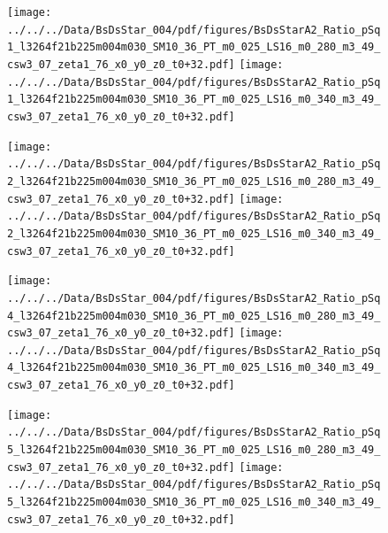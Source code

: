 \documentclass[a4paper,10pt]{article}
\begin{document}
\begin{figure}[p]
 \texttt{[image: ../../../Data/BsDsStar\_004/pdf/figures/BsDsStarA2\_Ratio\_pSq1\_l3264f21b225m004m030\_SM10\_36\_PT\_m0\_025\_LS16\_m0\_280\_m3\_49\_csw3\_07\_zeta1\_76\_x0\_y0\_z0\_t0+32.pdf]} 
 \texttt{[image: ../../../Data/BsDsStar\_004/pdf/figures/BsDsStarA2\_Ratio\_pSq1\_l3264f21b225m004m030\_SM10\_36\_PT\_m0\_025\_LS16\_m0\_340\_m3\_49\_csw3\_07\_zeta1\_76\_x0\_y0\_z0\_t0+32.pdf]} 
 \end{figure}
\begin{figure}[p]
 \texttt{[image: ../../../Data/BsDsStar\_004/pdf/figures/BsDsStarA2\_Ratio\_pSq2\_l3264f21b225m004m030\_SM10\_36\_PT\_m0\_025\_LS16\_m0\_280\_m3\_49\_csw3\_07\_zeta1\_76\_x0\_y0\_z0\_t0+32.pdf]} 
 \texttt{[image: ../../../Data/BsDsStar\_004/pdf/figures/BsDsStarA2\_Ratio\_pSq2\_l3264f21b225m004m030\_SM10\_36\_PT\_m0\_025\_LS16\_m0\_340\_m3\_49\_csw3\_07\_zeta1\_76\_x0\_y0\_z0\_t0+32.pdf]} 
 \end{figure}
\begin{figure}[p]
 \texttt{[image: ../../../Data/BsDsStar\_004/pdf/figures/BsDsStarA2\_Ratio\_pSq4\_l3264f21b225m004m030\_SM10\_36\_PT\_m0\_025\_LS16\_m0\_280\_m3\_49\_csw3\_07\_zeta1\_76\_x0\_y0\_z0\_t0+32.pdf]} 
 \texttt{[image: ../../../Data/BsDsStar\_004/pdf/figures/BsDsStarA2\_Ratio\_pSq4\_l3264f21b225m004m030\_SM10\_36\_PT\_m0\_025\_LS16\_m0\_340\_m3\_49\_csw3\_07\_zeta1\_76\_x0\_y0\_z0\_t0+32.pdf]} 
 \end{figure}
\clearpage
\begin{figure}[p]
 \texttt{[image: ../../../Data/BsDsStar\_004/pdf/figures/BsDsStarA2\_Ratio\_pSq5\_l3264f21b225m004m030\_SM10\_36\_PT\_m0\_025\_LS16\_m0\_280\_m3\_49\_csw3\_07\_zeta1\_76\_x0\_y0\_z0\_t0+32.pdf]} 
 \texttt{[image: ../../../Data/BsDsStar\_004/pdf/figures/BsDsStarA2\_Ratio\_pSq5\_l3264f21b225m004m030\_SM10\_36\_PT\_m0\_025\_LS16\_m0\_340\_m3\_49\_csw3\_07\_zeta1\_76\_x0\_y0\_z0\_t0+32.pdf]} 
 \end{figure}
\clearpage
\end{document}
